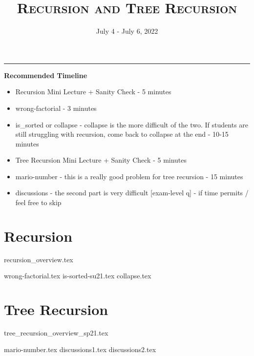 \documentclass{exam}
\title{\textsc{Recursion and Tree Recursion}}
\date{July 4 - July 6, 2022}
\begin{document}
\maketitle
\rule{\textwidth}{0.15em}
\fontsize{12}{15}\selectfont

\begin{guide}
\textbf{Recommended Timeline}
\begin{itemize}
    \item Recursion Mini Lecture + Sanity Check - 5 minutes
    \item wrong-factorial - 3 minutes
    \item is\_sorted or collapse - collapse is the more difficult of the two. If students are still
    struggling with recursion, come back to collapse at the end - 10-15 minutes
    \item Tree Recursion Mini Lecture + Sanity Check - 5 minutes
    \item mario-number - this is a really good problem for tree recursion - 15 minutes
    \item discussions - the second part is very difficult [exam-level q] -  if time permits / feel free to skip
\end{itemize}
\end{guide}

\section{Recursion}
{recursion_overview.tex}
\begin{questions}
    {wrong-factorial.tex}
    \pagebreak
    {is-sorted-su21.tex}
    {collapse.tex}
\end{questions}

\pagebreak

\section{Tree Recursion}
{tree_recursion_overview_sp21.tex}
\pagebreak
\begin{questions}
{mario-number.tex}
\pagebreak
{discussions1.tex}
\pagebreak
{discussions2.tex}
\end{questions}
\end{document}
